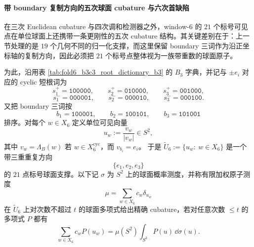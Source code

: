 \paragraph{带 boundary 复制方向的五次球面 cubature 与六次首缺陷}
在三次 Euclidean cubature 与四次调和检测器之外，window-\(6\) 的 \(21\) 个标号可见点在单位球面上还携带一条更刚性的五次 cubature 结构。其关键差别在于：上一节处理的是 \(19\) 个几何不同的归一化支撑，而这里保留 boundary 三词作为沿正坐标轴的复制方向，因此必须把 \(21\) 个标号点整体视为一族带重数的球面原子。

为此，沿用表 \ref{tab:fold6_b3c3_root_dictionary_b3} 的 \(B_3\) 字典，并记与 \(\pm e_i\) 对应的 cyclic 短根词为
\[
s_1^+=\texttt{100000},\qquad s_2^+=\texttt{010000},\qquad s_3^+=\texttt{001000},
\]
\[
s_1^-=\texttt{000001},\qquad s_2^-=\texttt{000010},\qquad s_3^-=\texttt{000100}.
\]
又把 boundary 三词按
\[
b_1=\texttt{100001},\qquad b_2=\texttt{100101},\qquad b_3=\texttt{101001}
\]
排序。对每个 \(w\in X_6\) 定义单位可见向量
\[
u_w:=\frac{v_w}{|v_w|}\in S^2,
\]
其中 \(v_w=\Lambda_B(w)\) 若 \(w\in X_6^{\mathrm{cyc}}\)，而 \(v_{b_i}=e_i\)。
于是 \(\widetilde U_6:=\{u_w:\ w\in X_6\}\) 是一个带三重重复方向
\[
\{e_1,e_2,e_3\}
\]
的 \(21\) 点标号球面支撑。以下记 \(\sigma\) 为 \(S^2\) 上的球面概率测度，并称有限加权原子测度
\[
\mu=\sum_{w\in X_6}c_w\delta_{u_w}
\]
在 \(\widetilde U_6\) 上对次数不超过 \(t\) 的球面多项式给出精确 cubature，若对任意次数 \(\le t\) 的多项式 \(P\) 都有
\[
\sum_{w\in X_6}c_w P(u_w)=\mu(S^2)\int_{S^2}P(u)\,\dd\sigma(u).
\]

